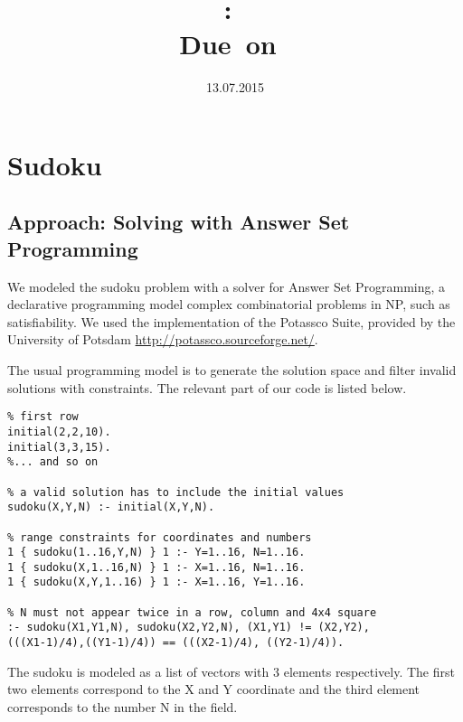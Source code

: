 \documentclass{article}
\title{
\vspace{2in}
\textmd{\textbf{\hmwkClass:\ \hmwkTitle}}\\
\normalsize\vspace{0.1in}\small{Due\ on\ \hmwkDueDate}\\
\vspace{0.1in}\large{\textit{\hmwkClassInstructor}}
\vspace{3in}
}
\author{\textbf{\hmwkAuthorName}}
\date{13.07.2015} %
\begin{document}
\maketitle


\newpage


\section{Sudoku}

\subsection{Approach: Solving with Answer Set Programming}
We modeled the sudoku problem with a solver for Answer Set Programming, a declarative programming model complex combinatorial problems in NP, such as satisfiability.
We used the implementation of the Potassco Suite, provided by the University of Potsdam \url{http://potassco.sourceforge.net/}.

The usual programming model is to generate the solution space and filter invalid solutions with constraints.
The relevant part of our code is listed below.

\begin{verbatim}
% first row
initial(2,2,10).
initial(3,3,15).
%... and so on

% a valid solution has to include the initial values
sudoku(X,Y,N) :- initial(X,Y,N).

% range constraints for coordinates and numbers
1 { sudoku(1..16,Y,N) } 1 :- Y=1..16, N=1..16.
1 { sudoku(X,1..16,N) } 1 :- X=1..16, N=1..16.
1 { sudoku(X,Y,1..16) } 1 :- X=1..16, Y=1..16.

% N must not appear twice in a row, column and 4x4 square
:- sudoku(X1,Y1,N), sudoku(X2,Y2,N), (X1,Y1) != (X2,Y2),
(((X1-1)/4),((Y1-1)/4)) == (((X2-1)/4), ((Y2-1)/4)).

\end{verbatim}

The sudoku is modeled as a list of vectors with 3 elements respectively.
The first two elements correspond to the X and Y coordinate and the third element corresponds to the number N in the field.
\end{document}
